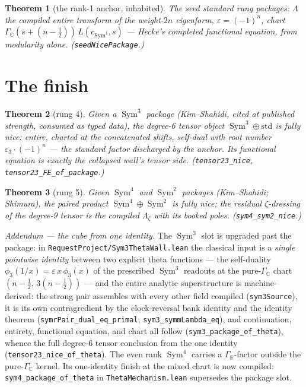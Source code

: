\documentclass[11pt]{article}
\newtheorem{theorem}{Theorem}
\newcommand{\Sym}{\operatorname{Sym}}
\newcommand{\Gm}{\Gamma_{\mathbb C}}
\begin{document}
\begin{theorem}[the rank-1 anchor, inhabited]
The seed standard rung packages: $\Lambda$ the compiled entire transform of the
weight-$2n$ eigenform, $\varepsilon=(-1)^n$, chart $\Gm(s+(n-\tfrac12))\,L(c_{\Sym^1},s)$
--- Hecke's completed functional equation, from modularity alone.
(\texttt{seedNicePackage}.)
\end{theorem}

\section{The finish}

\begin{theorem}[rung 4]
Given a $\Sym^3$ package (Kim--Shahidi, cited at published strength, consumed as typed
data), the degree-6 tensor object $\Sym^3\oplus\mathrm{std}$ is fully nice: entire,
charted at the concatenated shifts, self-dual with root number
$\varepsilon_3\cdot(-1)^n$ --- the standard factor discharged by the anchor.  Its
functional equation is exactly the collapsed wall's tensor side.
(\texttt{tensor23\_nice}, \texttt{tensor23\_FE\_of\_package}.)
\end{theorem}

\begin{theorem}[rung 5]
Given $\Sym^4$ and $\Sym^2$ packages (Kim--Shahidi; Shimura), the paired product
$\Sym^4\oplus\Sym^2$ is fully nice; the residual $\zeta$-dressing of the degree-9 tensor
is the compiled $\Lambda_\zeta$ with its booked poles.  (\texttt{sym4\_sym2\_nice}.)
\end{theorem}

\emph{Addendum --- the cube from one identity.}  The $\Sym^3$ slot is upgraded past the
package: in \texttt{RequestProject/Sym3ThetaWall.lean} the classical input is a
\emph{single pointwise identity} between two explicit theta functions --- the
self-duality $\phi_3(1/x)=\varepsilon\,x\,\phi_3(x)$ of the prescribed $\Sym^3$
readouts at the pure-$\Gm$ chart $(n-\tfrac12,\,3(n-\tfrac12))$ --- and the entire
analytic superstructure is machine-derived: the strong pair assembles with every other
field compiled (\texttt{sym3Source}), it is its own contragredient by the clock-reversal
bank identity and the identity theorem (\texttt{symrPair\_dual\_eq\_primal},
\texttt{sym3\_symmLambda\_eq}), and continuation, entirety, functional equation, and
chart all follow (\texttt{sym3\_package\_of\_theta}), whence the full degree-6 tensor
conclusion from the one identity (\texttt{tensor23\_nice\_of\_theta}).  The even rank
$\Sym^4$ carries a $\Gamma_{\mathbb R}$-factor outside the pure-$\Gm$ kernel.  Its
one-identity finish at the mixed chart is now compiled:
\texttt{sym4\_package\_of\_theta} in \texttt{ThetaMechanism.lean} supersedes the
package slot.
\end{document}
